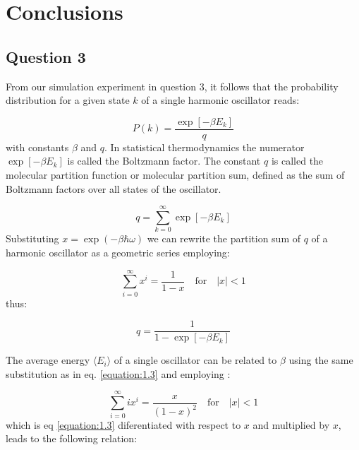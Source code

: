 \documentclass[10pt]{article}
\begin{document}
\maketitle
\pagebreak
\section{Conclusions \cite{IMSSS}}

\subsection{Question 3}
From our simulation experiment in question 3, it follows that the probability distribution for
a given state $k$ of a single harmonic oscillator reads:

\begin{equation} %
   P(k)=\frac{\exp[-\beta E_k]}{q}
   \label{equation:1.1} 
\end{equation}
%
with constants $\beta$ and $q$. In statistical thermodynamics the numerator $\exp[-\beta E_k]$ is called the Boltzmann factor. The constant $q$ is called the molecular partition function or molecular partition sum, defined as the sum of Boltzmann factors over all states of the oscillator.

\begin{equation} %
   q=\sum_{k=0}^{\infty}\exp[-\beta E_k]
   \label{equation:1.2} 
\end{equation}
%
Substituting $x=\exp(-\beta\hbar\omega)$ we can rewrite the partition sum of $q$ of a harmonic oscillator as a geometric series employing:

\begin{equation} %
   \sum_{i=0}^{\infty} x^i=\frac{1}{1-x} \quad \text{for}\quad|x|<1
   \label{equation:1.3} 
\end{equation}
%
thus:

\begin{equation} %
   q=\frac{1}{1-\exp[-\beta E_k]} 
   \label{equation:1.4} 
\end{equation}

The average energy $\langle E_i\rangle$ of a single oscillator can be related to $\beta$  using the same substitution as in eq. \eqref{equation:1.3} and employing :

\begin{equation} %
   \sum_{i=0}^{\infty} ix^i=\frac{x}{(1-x)^2} \quad \text{for}\quad|x|<1
   \label{equation:1.5} 
\end{equation}
%
which is eq \eqref{equation:1.3} diferentiated with respect to $x$ and multiplied by $x$, leads to the following relation:
\end{document}

